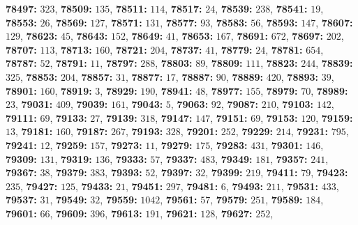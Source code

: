 \textsf{\bfseries 78497:} $323$, \textsf{\bfseries 78509:} $135$, \textsf{\bfseries 78511:} $114$, \textsf{\bfseries 78517:} $24$, \textsf{\bfseries 78539:} $238$, \textsf{\bfseries 78541:} $19$, \textsf{\bfseries 78553:} $26$, \textsf{\bfseries 78569:} $127$, \textsf{\bfseries 78571:} $131$, \textsf{\bfseries 78577:} $93$, \textsf{\bfseries 78583:} $56$, \textsf{\bfseries 78593:} $147$, \textsf{\bfseries 78607:} $129$, \textsf{\bfseries 78623:} $45$, \textsf{\bfseries 78643:} $152$, \textsf{\bfseries 78649:} $41$, \textsf{\bfseries 78653:} $167$, \textsf{\bfseries 78691:} $672$, \textsf{\bfseries 78697:} $202$, \textsf{\bfseries 78707:} $113$, \textsf{\bfseries 78713:} $160$, \textsf{\bfseries 78721:} $204$, \textsf{\bfseries 78737:} $41$, \textsf{\bfseries 78779:} $24$, \textsf{\bfseries 78781:} $654$, \textsf{\bfseries 78787:} $52$, \textsf{\bfseries 78791:} $11$, \textsf{\bfseries 78797:} $288$, \textsf{\bfseries 78803:} $89$, \textsf{\bfseries 78809:} $111$, \textsf{\bfseries 78823:} $244$, \textsf{\bfseries 78839:} $325$, \textsf{\bfseries 78853:} $204$, \textsf{\bfseries 78857:} $31$, \textsf{\bfseries 78877:} $17$, \textsf{\bfseries 78887:} $90$, \textsf{\bfseries 78889:} $420$, \textsf{\bfseries 78893:} $39$, \textsf{\bfseries 78901:} $160$, \textsf{\bfseries 78919:} $3$, \textsf{\bfseries 78929:} $190$, \textsf{\bfseries 78941:} $48$, \textsf{\bfseries 78977:} $155$, \textsf{\bfseries 78979:} $70$, \textsf{\bfseries 78989:} $23$, \textsf{\bfseries 79031:} $409$, \textsf{\bfseries 79039:} $161$, \textsf{\bfseries 79043:} $5$, \textsf{\bfseries 79063:} $92$, \textsf{\bfseries 79087:} $210$, \textsf{\bfseries 79103:} $142$, \textsf{\bfseries 79111:} $69$, \textsf{\bfseries 79133:} $27$, \textsf{\bfseries 79139:} $318$, \textsf{\bfseries 79147:} $147$, \textsf{\bfseries 79151:} $69$, \textsf{\bfseries 79153:} $120$, \textsf{\bfseries 79159:} $13$, \textsf{\bfseries 79181:} $160$, \textsf{\bfseries 79187:} $267$, \textsf{\bfseries 79193:} $328$, \textsf{\bfseries 79201:} $252$, \textsf{\bfseries 79229:} $214$, \textsf{\bfseries 79231:} $795$, \textsf{\bfseries 79241:} $12$, \textsf{\bfseries 79259:} $157$, \textsf{\bfseries 79273:} $11$, \textsf{\bfseries 79279:} $175$, \textsf{\bfseries 79283:} $431$, \textsf{\bfseries 79301:} $146$, \textsf{\bfseries 79309:} $131$, \textsf{\bfseries 79319:} $136$, \textsf{\bfseries 79333:} $57$, \textsf{\bfseries 79337:} $483$, \textsf{\bfseries 79349:} $181$, \textsf{\bfseries 79357:} $241$, \textsf{\bfseries 79367:} $38$, \textsf{\bfseries 79379:} $383$, \textsf{\bfseries 79393:} $52$, \textsf{\bfseries 79397:} $32$, \textsf{\bfseries 79399:} $219$, \textsf{\bfseries 79411:} $79$, \textsf{\bfseries 79423:} $235$, \textsf{\bfseries 79427:} $125$, \textsf{\bfseries 79433:} $21$, \textsf{\bfseries 79451:} $297$, \textsf{\bfseries 79481:} $6$, \textsf{\bfseries 79493:} $211$, \textsf{\bfseries 79531:} $433$, \textsf{\bfseries 79537:} $31$, \textsf{\bfseries 79549:} $32$, \textsf{\bfseries 79559:} $1042$, \textsf{\bfseries 79561:} $57$, \textsf{\bfseries 79579:} $251$, \textsf{\bfseries 79589:} $184$, \textsf{\bfseries 79601:} $66$, \textsf{\bfseries 79609:} $396$, \textsf{\bfseries 79613:} $191$, \textsf{\bfseries 79621:} $128$, \textsf{\bfseries 79627:} $252$, 
